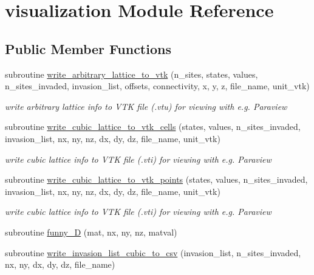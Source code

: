 \hypertarget{classvisualization}{
\section{visualization \-Module \-Reference}
\label{classvisualization}
}
\subsection*{\-Public \-Member \-Functions}
\begin{DoxyCompactItemize}
\item 
subroutine \hyperlink{classvisualization_aa798cf4314654eba82cc073840f0b4c4}{write\-\_\-arbitrary\-\_\-lattice\-\_\-to\-\_\-vtk} (n\-\_\-sites, states, values, n\-\_\-sites\-\_\-invaded, invasion\-\_\-list, offsets, connectivity, x, y, z, file\-\_\-name, unit\-\_\-vtk)
\begin{DoxyCompactList}\small\item\em write arbitrary lattice info to \-V\-T\-K file (.vtu) for viewing with e.\-g. \-Paraview \end{DoxyCompactList}\item 
subroutine \hyperlink{classvisualization_a137aa9c081d33d7e30c522f9359a76d2}{write\-\_\-cubic\-\_\-lattice\-\_\-to\-\_\-vtk\-\_\-cells} (states, values, n\-\_\-sites\-\_\-invaded, invasion\-\_\-list, nx, ny, nz, dx, dy, dz, file\-\_\-name, unit\-\_\-vtk)
\begin{DoxyCompactList}\small\item\em write cubic lattice info to \-V\-T\-K file (.vti) for viewing with e.\-g. \-Paraview \end{DoxyCompactList}\item 
subroutine \hyperlink{classvisualization_abd90196d6083b03d8d1d27da099e65d2}{write\-\_\-cubic\-\_\-lattice\-\_\-to\-\_\-vtk\-\_\-points} (states, values, n\-\_\-sites\-\_\-invaded, invasion\-\_\-list, nx, ny, nz, dx, dy, dz, file\-\_\-name, unit\-\_\-vtk)
\begin{DoxyCompactList}\small\item\em write cubic lattice info to \-V\-T\-K file (.vti) for viewing with e.\-g. \-Paraview \end{DoxyCompactList}\item 
subroutine \hyperlink{classvisualization_ac68622a48616ee2e973f6105485dd60e}{funny\-\_\-D} (mat, nx, ny, nz, matval)
\item 
subroutine \hyperlink{classvisualization_a3f4f9f57c76c569e203fc4b1049f6a54}{write\-\_\-invasion\-\_\-list\-\_\-cubic\-\_\-to\-\_\-csv} (invasion\-\_\-list, n\-\_\-sites\-\_\-invaded, nx, ny, dx, dy, dz, file\-\_\-name)

\end{DoxyCompactItemize}
